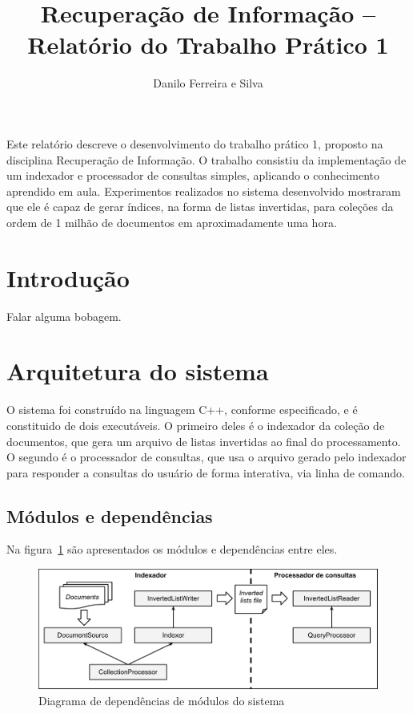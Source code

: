 \documentclass[12pt]{article}
\title{Recuperação de Informação -- Relatório do Trabalho Prático 1}
\author{Danilo Ferreira e Silva\inst{1}}
\begin{document}
 

\maketitle
     
\begin{resumo} 
  Este relatório descreve o desenvolvimento do trabalho prático 1, proposto na 
  disciplina Recuperação de Informação. O trabalho consistiu da implementação de um
  indexador e processador de consultas simples, aplicando o conhecimento aprendido em
  aula. Experimentos realizados no sistema desenvolvido mostraram que ele é capaz de gerar
  índices, na forma de listas invertidas, para coleções da ordem de 1 milhão de
  documentos em aproximadamente uma hora.
\end{resumo}


\section{Introdução}

Falar alguma bobagem.


\section{Arquitetura do sistema} \label{sec:firstpage}

O sistema foi construído na linguagem C++, conforme especificado, e é constituido de 
dois executáveis. O primeiro deles é o indexador da coleção de documentos, que gera 
um arquivo de listas invertidas ao final do processamento.
O segundo é o processador de consultas, que usa o arquivo gerado pelo
indexador para responder a consultas do usuário de forma interativa, via linha de
comando.


\subsection{Módulos e dependências}

Na figura~\ref{fig:modules} são apresentados os módulos e dependências entre eles.

\begin{figure}[ht]
\centering
\includegraphics[width=1\textwidth]{modules.pdf}
\caption{Diagrama de dependências de módulos do sistema}
\label{fig:modules}
\end{figure}
\end{document}
